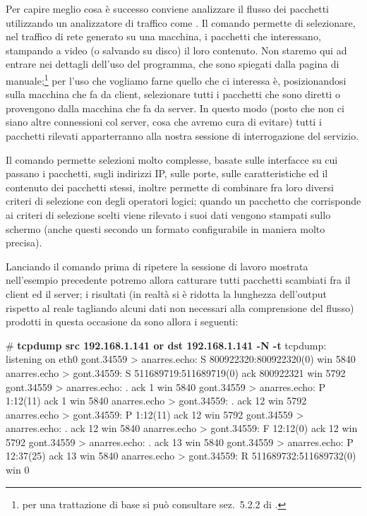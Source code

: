 Per capire meglio cosa è successo conviene analizzare il flusso dei pacchetti
utilizzando un analizzatore di traffico come . Il comando
permette di selezionare, nel traffico di rete generato su una macchina, i
pacchetti che interessano, stampando a video (o salvando su disco) il loro
contenuto. Non staremo qui ad entrare nei dettagli dell'uso del programma, che
sono spiegati dalla pagina di manuale;\footnote{per una trattazione di base si
  può consultare sez.~5.2.2 di \cite{SGL}.} per l'uso che vogliamo farne
quello che ci interessa è, posizionandosi sulla macchina che fa da client,
selezionare tutti i pacchetti che sono diretti o provengono dalla macchina che
fa da server. In questo modo (posto che non ci siano altre connessioni col
server, cosa che avremo cura di evitare) tutti i pacchetti rilevati
apparterranno alla nostra sessione di interrogazione del servizio.

Il comando  permette selezioni molto complesse, basate sulle
interfacce su cui passano i pacchetti, sugli indirizzi IP, sulle porte, sulle
caratteristiche ed il contenuto dei pacchetti stessi, inoltre permette di
combinare fra loro diversi criteri di selezione con degli operatori logici;
quando un pacchetto che corrisponde ai criteri di selezione scelti viene
rilevato i suoi dati vengono stampati sullo schermo (anche questi secondo un
formato configurabile in maniera molto precisa).  

Lanciando il comando prima di ripetere la sessione di lavoro mostrata
nell'esempio precedente potremo allora catturare tutti pacchetti scambiati fra
il client ed il server; i risultati (in realtà si è ridotta la lunghezza
dell'output rispetto al reale tagliando alcuni dati non necessari alla
comprensione del flusso) prodotti in questa occasione da  sono
allora i seguenti:
\begin{Console}
# \textbf{tcpdump src 192.168.1.141 or dst 192.168.1.141 -N -t}
tcpdump: listening on eth0
gont.34559 > anarres.echo: S 800922320:800922320(0) win 5840 
anarres.echo > gont.34559: S 511689719:511689719(0) ack 800922321 win 5792 
gont.34559 > anarres.echo: . ack 1 win 5840 
gont.34559 > anarres.echo: P 1:12(11) ack 1 win 5840 
anarres.echo > gont.34559: . ack 12 win 5792 
anarres.echo > gont.34559: P 1:12(11) ack 12 win 5792 
gont.34559 > anarres.echo: . ack 12 win 5840 
anarres.echo > gont.34559: F 12:12(0) ack 12 win 5792 
gont.34559 > anarres.echo: . ack 13 win 5840 
gont.34559 > anarres.echo: P 12:37(25) ack 13 win 5840 
anarres.echo > gont.34559: R 511689732:511689732(0) win 0 
\end{Console}

